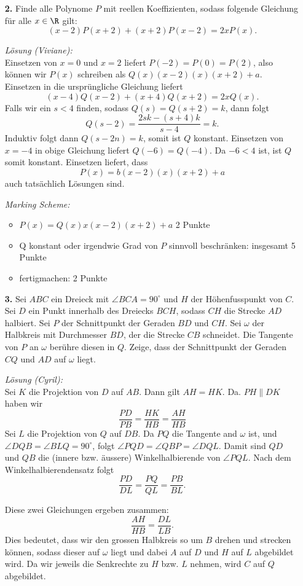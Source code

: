 \documentclass[language=german,style=solution]{smo}
\begin{document}
\begin{enumerate}
\newpage

\item[\textbf{2.}] %
Finde alle Polynome $P$ mit reellen Koeffizienten, sodass folgende Gleichung für alle $x \in \R$ gilt:
\[
(x-2)P(x+2)+(x+2)P(x-2)=2xP(x).
\]

\textit{Lösung (Viviane):}\\
Einsetzen von $x=0$ und $x=2$ liefert $P(-2)=P(0)=P(2)$, also können wir $P(x)$ schreiben als $Q(x)(x-2)(x)(x+2)+a$. Einsetzen in die ursprüngliche Gleichung liefert
\[
(x-4)Q(x-2)+(x+4)Q(x+2)=2xQ(x).
\]
Falls wir ein $s<4$ finden, sodass $Q(s)=Q(s+2)=k$, dann folgt
\[
Q(s-2)=\frac{2sk-(s+4)k}{s-4}=k.
\]
Induktiv folgt dann $Q(s-2n)=k$, somit ist $Q$ konstant.
Einsetzen von $x=-4$ in obige Gleichung liefert $Q(-6)=Q(-4)$. Da $-6<4$ ist, ist $Q$ somit konstant. Einsetzen liefert, dass
\[
P(x)=b(x-2)(x)(x+2)+a
\]
auch tatsächlich Lösungen sind.

\textit{Marking Scheme:}
\begin{itemize}
\item $P(x)=Q(x)x(x-2)(x+2)+a$ 2 Punkte
\item Q konstant oder irgendwie Grad von $P$ sinnvoll beschränken: insgesamt 5 Punkte
\item fertigmachen: 2 Punkte
\end{itemize}
\newpage

\item[\textbf{3.}] %
Sei $ABC$ ein Dreieck mit $\angle BCA = 90^\circ$ und $H$ der Höhenfusspunkt von $C$. Sei $D$ ein Punkt innerhalb des Dreiecks $BCH$, sodass $CH$ die Strecke $AD$ halbiert. Sei $P$ der Schnittpunkt der Geraden $BD$ und $CH$. Sei $\omega$ der Halbkreis mit Durchmesser $BD$, der die Strecke $CB$ schneidet. Die Tangente von $P$ an $\omega$ berühre diesen in $Q$. Zeige, dass der Schnittpunkt der Geraden $CQ$ und $AD$ auf $\omega$ liegt.

\textit{Lösung (Cyril):}\\
Sei $K$ die Projektion von $D$ auf $AB$. Dann gilt $AH = HK$. Da. $PH \parallel DK$ haben wir
\[
\frac{PD}{PB} = \frac{HK}{HB} =  \frac{AH}{HB}
\]
Sei $L$ die Projektion von $Q$ auf $DB$. Da $PQ$ die Tangente and $\omega$ ist, und $\angle DQB = \angle BLQ = 90^\circ$, folgt $\angle PQD = \angle QBP = \angle DQL$. Damit sind $QD$ und $QB$ die (innere bzw. äussere) Winkelhalbierende von $\angle PQL$. Nach dem Winkelhalbierendensatz folgt
\[
\frac{PD}{DL} =  \frac{PQ}{QL} = \frac{PB}{BL}.
\]

Diese zwei Gleichungen ergeben zusammen:
\[
\frac{AH}{HB} = \frac{DL}{LB}.
\]
Dies bedeutet, dass wir den grossen Halbkreis so um $B$ drehen und strecken können, sodass dieser auf $\omega$ liegt und dabei $A$ auf $D$ und $H$ auf $L$ abgebildet wird. Da wir jeweils die Senkrechte zu $H$ bzw. $L$ nehmen, wird $C$ auf $Q$ abgebildet.


\end{enumerate}
\end{document}
